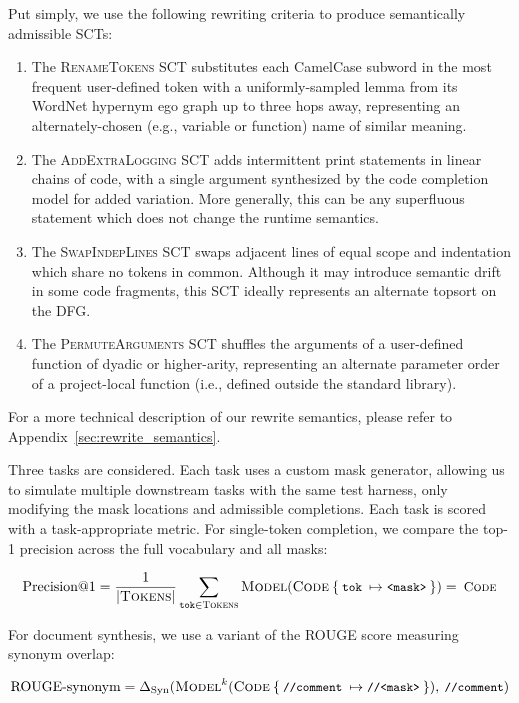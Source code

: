 \documentclass[usenames,dvipsnames]{article} %
\begin{document}
  Put simply, we use the following rewriting criteria to produce semantically admissible SCTs:

  \begin{enumerate}[itemsep=1ex]
    \item The \textsc{RenameTokens} SCT substitutes each CamelCase subword in the most frequent user-defined token with a uniformly-sampled lemma from its WordNet hypernym ego graph up to three hops away, representing an alternately-chosen (e.g., variable or function) name of similar meaning.
    \item The \textsc{AddExtraLogging} SCT adds intermittent print statements in linear chains of code, with a single argument synthesized by the code completion model for added variation. More generally, this can be any superfluous statement which does not change the runtime semantics.
    \item The \textsc{SwapIndepLines} SCT swaps adjacent lines of equal scope and indentation which share no tokens in common. Although it may introduce semantic drift in some code fragments, this SCT ideally represents an alternate topsort on the DFG.
    \item The \textsc{PermuteArguments} SCT shuffles the arguments of a user-defined function of dyadic or higher-arity, representing an alternate parameter order of a project-local function (i.e., defined outside the standard library).
  \end{enumerate}

  For a more technical description of our rewrite semantics, please refer to Appendix~\ref{sec:rewrite_semantics}.

  Three tasks are considered. Each task uses a custom mask generator, allowing us to simulate multiple downstream tasks with the same test harness, only modifying the mask locations and admissible completions. Each task is scored with a task-appropriate metric. For single-token completion, we compare the top-1 precision across the full vocabulary and all masks:

  \begin{equation*}
    \text{Precision@1} = \frac{1}{{|\textsc{Tokens}|}}\sum_{\texttt{tok}\in \textsc{Tokens}}\textsc{Model}(\textsc{Code}\:\{\:\small{\texttt{tok}}\:\mapsto\small{\texttt{<mask>}}\:\}) = \:\textsc{Code}
  \end{equation*}

  For document synthesis, we use a variant of the ROUGE score measuring synonym overlap:

  \begin{equation*}
    \text{ROUGE-synonym} = \Delta_{\text{Syn}}(\textsc{Model}^{k}(\textsc{Code}\:\{\:\small{\texttt{//comment}}\:\mapsto\texttt{//<mask>}\:\}), \:\texttt{//comment})
  \end{equation*}
\end{document}
